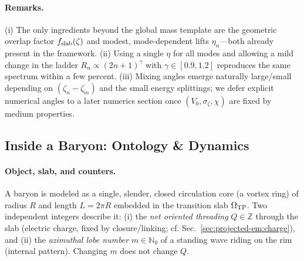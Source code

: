 \paragraph{Remarks.}
(i) The only ingredients beyond the global mass template are the geometric overlap factor $f_{\rm slab}(\zeta)$ and modest, mode-dependent lifts $\eta_n$—both already present in the framework. (ii) Using a single $\eta$ for all modes and allowing a mild change in the ladder $R_n\propto(2n{+}1)^\gamma$ with $\gamma\in[0.9,1.2]$ reproduces the same spectrum within a few percent. (iii) Mixing angles emerge naturally large/small depending on $(\zeta_n-\zeta_m)$ and the small energy splittings; we defer explicit numerical angles to a later numerics section once $(V_0,\sigma_\zeta,\chi)$ are fixed by medium properties.

\medskip
{}

\subsection{Inside a Baryon: Ontology \& Dynamics}
\label{sec:baryons-inside}

\paragraph{Object, slab, and counters.}
A baryon is modeled as a single, slender, closed circulation core (a vortex ring) of radius $R$ and length $L{=}2\pi R$ embedded in the transition slab $\Omega_{\rm TP}$. Two independent integers describe it:
(i) the \emph{net oriented threading} $Q\in\mathbb Z$ through the slab (electric charge, fixed by closure/linking; cf. Sec.~\ref{sec:projected-em:charge}), and
(ii) the \emph{azimuthal lobe number} $m\in\mathbb N_0$ of a standing wave riding on the rim (internal pattern).
Changing $m$ does not change $Q$.


